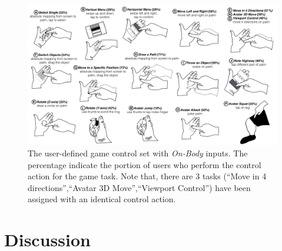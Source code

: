 \documentclass{sigchi}
\begin{document}
  \begin{figure}
  \centering
  \includegraphics[width=1\textwidth]{OnBodyInputSet.pdf}
  \caption{The user-defined game control set with \emph{On-Body} inputs. The percentage indicate the portion of users who perform the control action for the game task. Note that, there are 3 tasks (``Move in 4 directions'',``Avatar 3D Move'',``Viewport Control'') have been assigned with an identical control action.}
  \label{fig:OnBodyInputSet}
  \end{figure}


  \section{Discussion}
\end{document}
